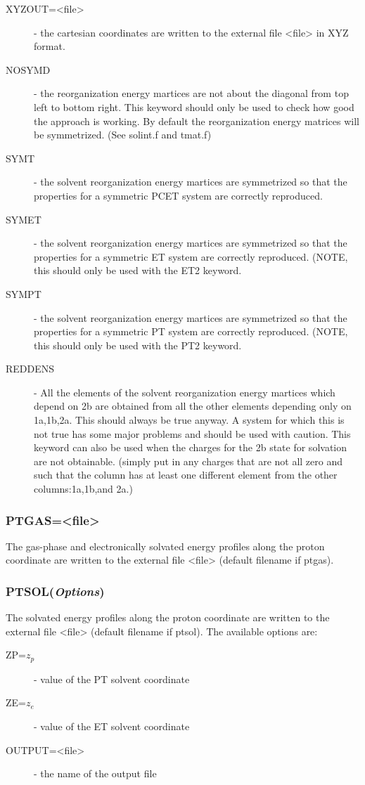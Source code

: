 \documentclass[oneside,11pt,openany]{book}
\newcommand{\tw}{\ttfamily}
\begin{document}
\begin{description}
\item[{\tw XYZOUT=<file>}] - the cartesian coordinates
are written to the external file {\tw <file>} in XYZ format.
\item[{\tw NOSYMD}] - the reorganization energy martices are not 
about the diagonal from top left to bottom right.  This keyword
should only be used to check how good the approach is working.  By 
default the reorganization energy matrices will be symmetrized.
(See solint.f and tmat.f)
\item[{\tw SYMT}] - the solvent reorganization energy martices are
symmetrized so that the properties for a symmetric PCET system are
correctly reproduced.
\item[{\tw SYMET}] - the solvent reorganization energy martices are
symmetrized so that the properties for a symmetric ET system are
correctly reproduced. (NOTE, this should only be used with the ET2
keyword.
\item[{\tw SYMPT}] - the solvent reorganization energy martices are
symmetrized so that the properties for a symmetric PT system are
correctly reproduced. (NOTE, this should only be used with the PT2
keyword.             
\item[{\tw REDDENS}] - All the elements of the solvent reorganization
energy martices which depend on 2b are obtained from all the other
elements depending only on 1a,1b,2a.  This should always be true anyway.  
A system for which this is not true has some major problems and should
be used with caution. This keyword can also be used when the
charges for the 2b state for solvation are not obtainable.  (simply
put in any charges that are not all zero 
and such that the column has at least 
one different element from the other columns:1a,1b,and 2a.)
\end{description}


\subsubsection*{PTGAS={\tw <file>}}
%
The gas-phase and electronically solvated energy profiles
along the proton coordinate are written to the external file
{\tw <file>} (default filename if {\tw ptgas}).

\subsubsection*{PTSOL({\it Options})}
The solvated energy profiles along the proton coordinate
are written to the external file {\tw <file>}
(default filename if {\tw ptsol}). The available options are:
\begin{description}
\item[{\tw ZP=$z_p$}] - value of the PT solvent coordinate
\item[{\tw ZE=$z_e$}] - value of the ET solvent coordinate
\item[{\tw OUTPUT=<file>}] - the name of the output file
\end{description}
\end{document}
